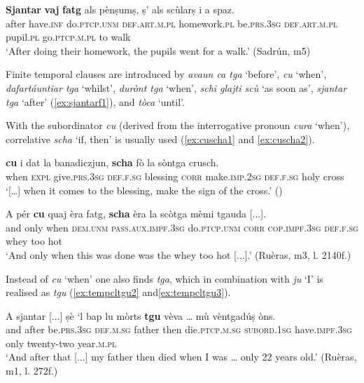 \ea
\label{ex:sjantarnonf1}
\gll \textbf{Sjantar} \textbf{vaj} \textbf{fatg} als pènṣumṣ, ṣ' als scùlarṣ i a spaz.\\
after have.\textsc{inf} do.\textsc{ptcp.unm} \textsc{def.art.m.pl} homework.\textsc{pl} be.\textsc{prs.3sg} \textsc{def.art.m.pl} pupil.\textsc{pl} go.\textsc{ptcp.m.pl} to walk\\
\glt `After doing their homework, the pupils went for a walk.' (Sadrún, m5)
\z

Finite temporal clauses are introduced by \textit{avaun ca tga} `before', \textit{cu} `when', \textit{dafartáuntiar tga} `whilst', \textit{durònt tga} `when', \textit{schi glajti scù} `as soon as', \textit{sjantar tga} `after' (\ref{ex:sjantarf1}), and \textit{tòca} `until'.

With the subordinator \textit{cu} (derived from the interrogative pronoun \textit{cura} `when'), correlative \textit{scha} `if, then' is usually used (\ref{ex:cuscha1} and \ref{ex:cuscha2}).

\ea
\label{ex:cuscha1}
\gll  […] \textbf{cu} i dat la banadiczjun, \textbf{scha} fò la sòntga crusch.\\
    {} when \textsc{expl} give.\textsc{prs.3sg} \textsc{def.f.sg} blessing \textsc{corr} make.\textsc{imp.2sg} \textsc{def.f.sg} holy cross\\
\glt `[…] when it comes to the blessing, make the sign of the cross.' (\citealt[23]{Berther2007})
\z

\ea
\label{ex:cuscha2}
	\gll  A pér \textbf{cu} quaj èra fatg, \textbf{scha} èra la scòtga mèmi tgauda [...].  \\
and only when \textsc{dem.unm} \textsc{pass.aux.impf.3sg} do.\textsc{ptcp.unm} \textsc{corr} \textsc{cop.impf.3sg} \textsc{def.f.sg} whey too hot\\
\glt `And only when this was done was the whey too hot [...].' (Ruèras, m3, l. 2140f.)
\z

Instead of \textit{cu} `when' one also finds \textit{tga}, which in combination with \textit{ju} `I' is realised as \textit{tgu} (\ref{ex:tempcltgu2} and\ref{ex:tempcltgu3}).

\ea
\label{ex:tempcltgu2}
\gll    A sjantar [...] ṣè `l bap lu mòrts \textbf{tgu} vèva … mù vèntgadúṣ òns.\\
and after {} be.\textsc{prs.3sg} \textsc{def.m.sg} father then die.\textsc{ptcp.m.sg} \textsc{subord.1sg} have.\textsc{impf.3sg} {} only twenty-two year.\textsc{m.pl}\\
\glt `And after that [...] my father then died when I was … only 22 years old.' (Ruèras, m1, l. 272f.)
\z

